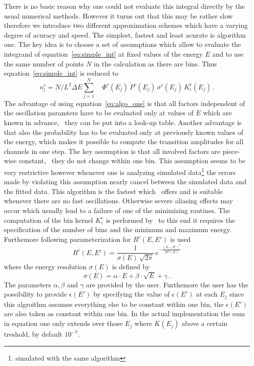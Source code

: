 There is no basic reason why one could not evaluate this integral directly
by the usual numerical methods. However it turns out that this may be rather
slow therefore we introduce two different approximation schemes which have
a varying degree of acuracy and speed. The simplest, fastest and
least acurate is algorithm one. The key idea is to choose a set of assumptions
which allow to evaluate the integrand of equation~\ref{eq:simple_int}
at fixed values of the energy $E$ and to use the same number of points $N$ in
the calculation as there are bins. Thus equation~\ref{eq:simple_int} is reduced
to
\begin{equation}
\label{eq:algo_one}
n_i^c=N/L^2 \Delta E \sum_{j=1}^N \quad  \Phi^c(E_j)\,
P^c(E_j)\,
\sigma^c(E_j)\,
K_i^c(E_j)\,.
\end{equation}
The advantage of using equation~\ref{eq:algo_one} is that all factors
independent of the oscillation paramters have to be evaluated only at 
values of $E$ which are known in advance, \ie\ they can be put 
into a look-up table. Another advantage is that also the probability
has to be evaluated only at previously known values of the energy, which
makes it possible to compute the transition amplitudes for all channels
in one step. The key assumption is that all involved factors are piece-wise
constant, \ie\ they do not change within one bin. This assumption seems to be
very restrictive however whenever one is analyzing simulated 
data\footnote{simulated with the same algorithm} the errors
made by violating this assumption nearly cancel between the simulated 
data and the fitted data. This algorithm is the fastest which \GLOBES\ offers
and is suitable whenever there are no fast oscillations. Otherwise severe
aliasing effects may occur which usually lead to a failure of one of the 
minimizing routines. The computation of the bin kernel $K_i^c$ is performed
by \GLOBES\, to this end it requires the specification of the number of bins
and the minimum and maximum energy. Furthemore following parameterization
for $R^c(E,E')$ is used
\begin{equation}
R^c(E,E')=\frac{1}{\sigma(E)\,\sqrt{2\pi}}\,e^{-\frac{(E-E')^2}{2\sigma^2(E)}}
\end{equation} 
where the energy resolution $\sigma(E)$ is defined by
\begin{equation}
\label{eq:sigma_e}
\sigma(E)=\alpha\cdot E + \beta \cdot \sqrt{E} +\gamma\,.
\end{equation}
The parameters $\alpha, \beta$ and $\gamma$ are provided by the user.
Furthemore the user has the possibility to provide $\epsilon(E')$ by specifying
the value of  $\epsilon(E')$ at each $E_j$ since this algroithm assumes
everything else to be constant within one bin, the  $\epsilon(E')$ are
also taken as constant within one bin. In the actual implementation the sum
in equation one only extends over those $E_j$ where $K(E_j)$ above a certain
treshold, by default $10^{-7}$.


